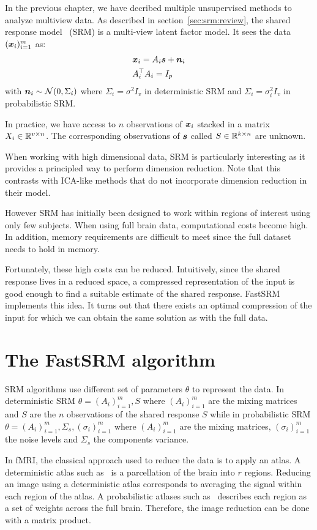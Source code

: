 In the previous chapter, we have decribed multiple unsupervised methods to analyze
multiview data.
As described in section~\ref{sec:srm:review}, the shared response
model~\cite{chen2015reduced} (SRM) is a multi-view latent factor model. It sees
the data $(\boldsymbol{x}_i)_{i=1}^m$ as:
\begin{align}
  &\boldsymbol{x}_i = A_i \boldsymbol{s} + \boldsymbol{n}_i \\
  &A_i^{\top}A_i = I_p
\end{align}
with $\boldsymbol{n}_i \sim \mathcal{N}(0, \Sigma_i)$ where $\Sigma_i = \sigma^2 I_v$ in
deterministic SRM and $\Sigma_i = \sigma_i^2 I_v$ in probabilistic SRM.

In practice, we have access to $n$ observations of $\boldsymbol{x}_i$ stacked in a matrix
$X_i \in \mathbb{R}^{v \times n}$. The corresponding
observations of $\boldsymbol{s}$ called $S \in \mathbb{R}^{k \times n}$ are unknown.

When working with high dimensional data, SRM is particularly
interesting as it provides a principled way to perform dimension reduction. Note that this
contrasts with ICA-like methods that do not incorporate dimension reduction in their model.

However SRM has initially been designed to work within regions of interest using
only few subjects. When using full brain data, computational costs become
high. In addition, memory requirements are difficult to meet since the full dataset needs to hold
in memory.

Fortunately, these high costs can be reduced. Intuitively, since the shared
response lives in a reduced space, a compressed representation of the input is
good enough to find a suitable estimate of the shared response.
FastSRM implements this idea. It turns out that there exists an optimal
compression of the input for which we can obtain the same solution as
with the full data.

\section{The FastSRM algorithm}
SRM algorithms use different set of parameters $\theta$ to represent the data.
In deterministic SRM $\theta = (A_i)_{i=1}^m, S$ where $(A_i)_{i=1}^m$ are the
mixing matrices and $S$ are the $n$ observations of the shared response $S$ while in probabilistic SRM $\theta
= (A_i)_{i=1}^m, \Sigma_s, (\sigma_i)_{i=1}^m$ where $(A_i)_{i=1}^m$ are the
mixing matrices, $(\sigma_i)_{i=1}^m$ the noise levels and $\Sigma_s$ the
components variance.

In fMRI, the classical approach used to reduce the data is to apply an atlas.
A deterministic atlas such as~\cite{bellec2010multi} is a parcellation of the
brain into $r$ regions. Reducing an image using a deterministic atlas corresponds to
averaging the signal within each region of the atlas. A probabilistic atlases such
as~\cite{dadi_fine-grain_2020} describes each region as a set of weights across
the full brain. Therefore, the image reduction can be done with a matrix product.

